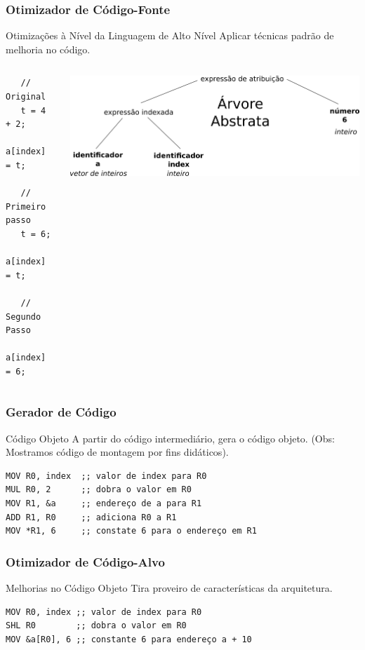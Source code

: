 \documentclass[table]{beamer}
\begin{document}
\begin{frame}[fragile]
   \frametitle{Otimizador de Código-Fonte}
   \begin{block}{Otimizações à Nível da Linguagem de Alto Nível}
   Aplicar técnicas padrão de melhoria no código.
   \end{block}
   \begin{columns}
      \begin{column}{0.3\textwidth}
         \footnotesize
         \begin{verbatim}
   // Original
   t = 4 + 2;
   a[index] = t;

   // Primeiro passo
   t = 6;
   a[index] = t;

   // Segundo Passo
   a[index] = 6;
         \end{verbatim}
      \end{column}	 
      \begin{column}{0.8\textwidth}
         \includegraphics[scale=0.3]{figuras/otimizadorcodigofonte.png}
      \end{column}	  
   \end{columns}
\end{frame}

\begin{frame}[fragile]
   \frametitle{Gerador de Código}
   \begin{block}{Código Objeto}
   A partir do código intermediário, gera o código objeto. (Obs: Mostramos código de montagem por fins didáticos).
   \end{block}
   \begin{verbatim}
MOV R0, index  ;; valor de index para R0   
MUL R0, 2      ;; dobra o valor em R0
MOV R1, &a     ;; endereço de a para R1
ADD R1, R0     ;; adiciona R0 a R1
MOV *R1, 6     ;; constate 6 para o endereço em R1
   \end{verbatim}
\end{frame}

\begin{frame}[fragile]
   \frametitle{Otimizador de Código-Alvo}
   \begin{block}{Melhorias no Código Objeto}
   Tira proveiro de características da arquitetura.
   \end{block}
   \begin{verbatim}
MOV R0, index ;; valor de index para R0
SHL R0        ;; dobra o valor em R0
MOV &a[R0], 6 ;; constante 6 para endereço a + 10
   \end{verbatim}
\end{frame}
\end{document}
